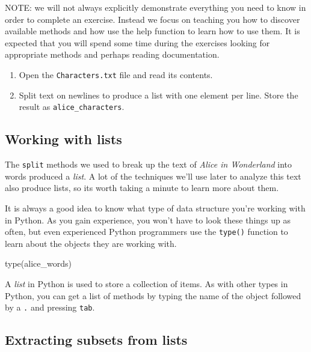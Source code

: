 \documentclass[]{book}
\newenvironment{Shaded}{\begin{snugshade}}{\end{snugshade}}
\newcommand{\BuiltInTok}[1]{#1}
\newcommand{\NormalTok}[1]{#1}
\begin{document}
NOTE: we will not always explicitly demonstrate everything you need to know in order to complete an exercise. Instead we focus on teaching you how to discover available methods and how use the help function to learn how to use them. It is expected that you will spend some time during the exercises looking for appropriate methods and perhaps reading documentation.

\begin{enumerate}
\def\labelenumi{\arabic{enumi}.}
\item
  Open the \texttt{Characters.txt} file and read its contents.
\item
  Split text on newlines to produce a list with one element per line. Store the result as \texttt{alice\_characters}.
\end{enumerate}

\hypertarget{working-with-lists}{%
\subsection{Working with lists}\label{working-with-lists}}

The \texttt{split} methods we used to break up the text of \emph{Alice in Wonderland} into words produced a \emph{list}. A lot of the techniques we'll use later to analyze this text also produce lists, so its worth taking a minute to learn more about them.

It is always a good idea to know what type of data structure you're working with in Python. As you gain experience, you won't have to look these things up as often, but even experienced Python programmers use the \texttt{type()} function to learn about the objects they are working with.

\begin{Shaded}
\begin{Highlighting}[]
\BuiltInTok{type}\NormalTok{(alice_words)}
\end{Highlighting}
\end{Shaded}

A \emph{list} in Python is used to store a collection of items. As with other types in Python, you can get a list of methods by typing the name of the object followed by a \texttt{.} and pressing \texttt{tab}.

\hypertarget{extracting-subsets-from-lists}{%
\subsection{Extracting subsets from lists}\label{extracting-subsets-from-lists}}
\end{document}
